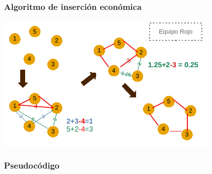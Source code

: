 \documentclass[13pt]{beamer}
\begin{document}
    \begin{frame}
		\frametitle{Algoritmo de inserción económica}
		\begin{center}
			\includegraphics[scale=1.5]{./img/DibInsercion.pdf}
		\end{center}
	\end{frame}

	\begin{frame}
		\frametitle{Pseudocódigo}
		
	\end{frame}
\end{document}
